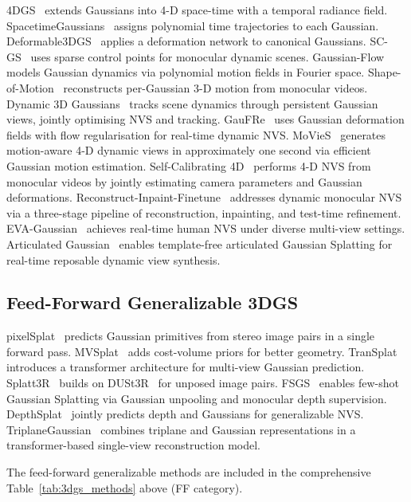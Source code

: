 4DGS~\citep{wu2024_4dgs} extends Gaussians into 4-D space-time with a
temporal radiance field.
SpacetimeGaussians~\citep{yang2024spacetime} assigns polynomial time
trajectories to each Gaussian.
Deformable3DGS~\citep{yang2024deformable} applies a deformation network to
canonical Gaussians.
SC-GS~\citep{huang2024scgs} uses sparse control points for monocular dynamic
scenes.
Gaussian-Flow~\citep{lin2024gaussianflow} models Gaussian dynamics via
polynomial motion fields in Fourier space.
Shape-of-Motion~\citep{wang2024shapeofmotion} reconstructs per-Gaussian 3-D
motion from monocular videos.
Dynamic 3D Gaussians~\citep{luiten2024dynamic3dgs} tracks scene dynamics
through persistent Gaussian views, jointly optimising NVS and tracking.
GauFRe~\citep{liang2024gaufre} uses Gaussian deformation fields with
flow regularisation for real-time dynamic NVS.
MoVieS~\citep{sun2024movies} generates motion-aware 4-D dynamic views in
approximately one second via efficient Gaussian motion estimation.
Self-Calibrating 4D~\citep{kim2024selfcal4d} performs 4-D NVS from monocular
videos by jointly estimating camera parameters and Gaussian deformations.
Reconstruct-Inpaint-Finetune~\citep{han2024rif} addresses dynamic monocular
NVS via a three-stage pipeline of reconstruction, inpainting, and test-time
refinement.
EVA-Gaussian~\citep{hu2024evacg} achieves real-time human NVS under diverse
multi-view settings.
Articulated Gaussian~\citep{li2024articulatedgs} enables template-free
articulated Gaussian Splatting for real-time reposable dynamic view synthesis.

\subsection{Feed-Forward Generalizable 3DGS}

pixelSplat~\citep{charatan2024pixelsplat} predicts Gaussian primitives from
stereo image pairs in a single forward pass.
MVSplat~\citep{chen2024mvsplat} adds cost-volume priors for better geometry.
TranSplat~\citep{zhang2024transplate} introduces a transformer architecture for
multi-view Gaussian prediction.
Splatt3R~\citep{smart2024splatt3r} builds on DUSt3R~\citep{wang2024dust3r}
for unposed image pairs.
FSGS~\citep{zhu2024fsgs} enables few-shot Gaussian Splatting via Gaussian
unpooling and monocular depth supervision.
DepthSplat~\citep{xu2024depthsplat} jointly predicts depth and Gaussians
for generalizable NVS.
TriplaneGaussian~\citep{zou2024triplanegaussian} combines triplane and
Gaussian representations in a transformer-based single-view reconstruction model.

The feed-forward generalizable methods are included in the comprehensive
Table~\ref{tab:3dgs_methods} above (FF category).

